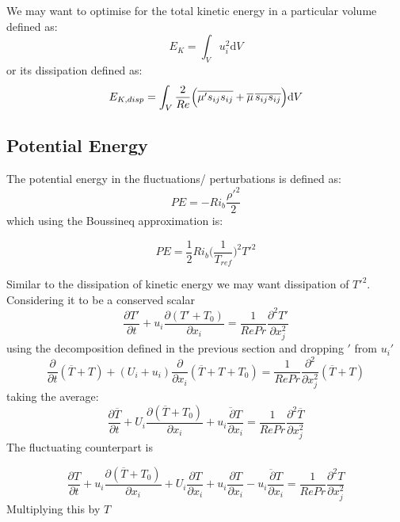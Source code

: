 \documentclass[preprint,12pt]{article}
\begin{document}
\begin{tcolorbox}
We may want to optimise for the total kinetic energy in a particular volume defined as:
\begin{equation}
E_K=\int_V u_i^2 \text{d}V
\end{equation}
or its dissipation defined as:
\begin{equation}
E_{K,disp}=\int_V \frac{2}{Re}\Big(\overline{{\mu'}s_{ij}s_{ij}}+{\overline{\mu}}\hspace{0.02in}\overline{s_{ij}s_{ij}}\Big) \text{d}V
\end{equation}
\end{tcolorbox}
\subsection{Potential Energy}
The potential energy in the fluctuations/ perturbations is defined as:
\begin{equation}
PE=-Ri_b \frac{\rho'^2}{2}
\end{equation}
which using the Boussineq approximation is:
\begin{tcolorbox}
\begin{equation}\label{eq:potenEnergy}
PE=\frac{1}{2}Ri_b \Big(\frac{1}{T_{ref}}\Big)^2T'^2
\end{equation}
\end{tcolorbox}
Similar to the dissipation of kinetic energy we may want dissipation of $T'^2$. Considering it to be a conserved scalar
\begin{equation}
\frac{\partial T'}{\partial t}+u_i\frac{\partial (T'+T_0)}{\partial x_i}=\frac{1}{Re Pr}\frac{\partial^2T'}{\partial x_j^2}
\end{equation}
using the decomposition defined in the previous section and dropping $'$ from $u_i'$
\begin{equation}
\frac{\partial }{\partial t}(\overline{T}+T)+(U_i+u_i)\frac{\partial }{\partial x_i}(\overline{T}+T+T_0)=\frac{1}{Re Pr}\frac{\partial^2}{\partial x_j^2}(\overline{T}+T)
\end{equation}
taking the average:
\begin{equation}
\frac{\partial\overline{T} }{\partial t}+U_i\frac{\partial (\overline{T}+T_0)}{\partial x_i}+\overline{{u_i}\frac{\partial {T}}{\partial x_i}}=\frac{1}{Re Pr}\frac{\partial^2\overline{T}}{\partial x_j^2}
\end{equation}
The fluctuating counterpart is

\begin{equation}
\frac{\partial {T}}{\partial t}+{u_i}\frac{\partial (\overline{T}+T_0)}{\partial x_i}+U_i\frac{\partial {T}}{\partial x_i}+{u_i}\frac{\partial {T}}{\partial x_i}-\overline{{u_i}\frac{\partial {T}}{\partial x_i}}=\frac{1}{Re Pr}\frac{\partial^2T}{\partial x_j^2}
\end{equation}
Multiplying this by $T$
\end{document}
